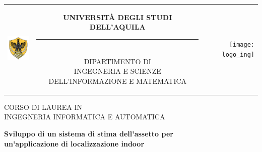 \begin{titlepage}

\begin{center}
\normalsize

\begin{center}
\begin{tabular}[t]{@{} l @{} c @{} r @{}}
\parbox[c]{0.15\textwidth}{\raggedright \includegraphics[width=0.80in]{logo_univ.png}}
&
\parbox[c]{0.7\textwidth}
{
\centering \bfseries
UNIVERSITÀ DEGLI STUDI DELL'AQUILA \\[-5pt]
\rule{0.65\textwidth}{1pt} \\
{\scshape DIPARTIMENTO DI \\ INGEGNERIA E SCIENZE DELL'INFORMAZIONE E MATEMATICA }
}
&
\parbox[c]{0.15\textwidth}{\raggedleft \texttt{[image: logo\_ing]}}
\end{tabular}
\end{center}

\bigskip \bigskip



\bigskip \bigskip

{\small CORSO DI LAUREA IN} \\
INGEGNERIA INFORMATICA E AUTOMATICA

\vfil \vfil \vfil

{\bfseries \large
Sviluppo di un sistema di stima dell'assetto  
per \\ un'applicazione di localizzazione indoor\\
}

\vfil \vfil \vfil

\end{center}
\end{titlepage}
